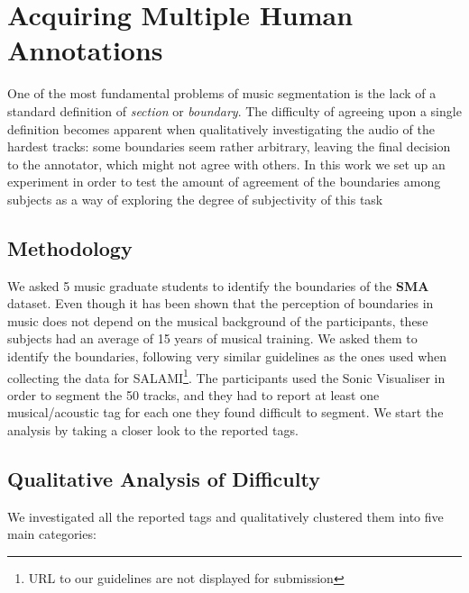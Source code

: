 \documentclass{article}
\begin{document}
\section{Acquiring Multiple Human Annotations}

One of the most fundamental problems of music segmentation is the lack of a standard definition of \textit{section} or \textit{boundary}. 
The difficulty of agreeing upon a single definition becomes apparent when qualitatively investigating the audio of the hardest tracks: some boundaries seem rather arbitrary, leaving the final decision to the annotator, which might not agree with others.
In this work we set up an experiment in order to test the amount of agreement of the boundaries among subjects as a way of exploring the degree of subjectivity of this task


\subsection{Methodology}

We asked 5 music graduate students to identify the boundaries of the \textbf{SMA} dataset.
Even though it has been shown that the perception of boundaries in music does not depend on the musical background of the participants\cite{Bruderer2009}, these subjects had an average of 15 years of musical training.
We asked them to identify the boundaries, following very similar guidelines as the ones used when collecting the data for SALAMI\cite{Smith2011}\footnote{URL to our guidelines are not displayed for submission}.
The participants used the Sonic Visualiser\cite{Cannam2006} in order to segment the 50 tracks, and they had to report at least one musical/acoustic tag for each one they found difficult to segment.
We start the analysis by taking a closer look to the reported tags.

\subsection{Qualitative Analysis of Difficulty}

We investigated all the reported tags and qualitatively clustered them into five main categories:
\end{document}
